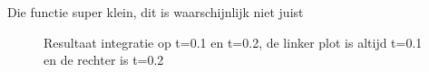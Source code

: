 \documentclass[11pt]{article} %
\begin{document}
	Die functie super klein, dit is waarschijnlijk niet juist
	\begin{figure}[H]
		\centering
		\hfill
	
		\caption{Resultaat integratie op t=0.1 en t=0.2, de linker plot is altijd t=0.1 en de rechter is t=0.2}
	\end{figure}
\end{document}

